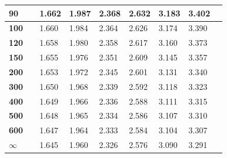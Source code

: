 \begin{longtable}{|l|l l|l|l|l|l|l|l|}
    \textbf{90} & & 1.662 & 1.987 & 2.368 & 2.632 & 3.183 & 3.402\\ \hline
    
    \textbf{100} & & 1.660 & 1.984 & 2.364 & 2.626 & 3.174 & 3.390\\ \hline
    
    \textbf{120} & & 1.658 & 1.980 & 2.358 & 2.617 & 3.160 & 3.373\\ \hline
    
    \textbf{150} & & 1.655 & 1.976 & 2.351 & 2.609 & 3.145 & 3.357\\ \hline
    
    \textbf{200} & & 1.653 & 1.972 & 2.345 & 2.601 & 3.131 & 3.340\\ \hline
    
    \textbf{300} & & 1.650 & 1.968 & 2.339 & 2.592 & 3.118 & 3.323\\ \hline
    
    \textbf{400} & & 1.649 & 1.966 & 2.336 & 2.588 & 3.111 & 3.315\\ \hline
    
    \textbf{500} & & 1.648 & 1.965 & 2.334 & 2.586 & 3.107 & 3.310\\ \hline
    
    \textbf{600} & & 1.647 & 1.964 & 2.333 & 2.584 & 3.104 & 3.307\\ \hline
 
 $\infty$ & & 1.645 & 1.960 & 2.326 & 2.576 & 3.090 & 3.291 \\ \hline
\end{longtable}
\renewcommand{\arraystretch}{1}
\changefontsizes{11pt}

